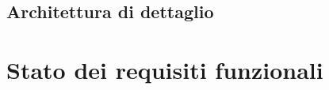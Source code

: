\documentclass[a4paper,10pt]{article}
\begin{document}
\subsection{Architettura di dettaglio}

\newpage



\newcommand{\reqF}[2]{%
    \refstepcounter{RF@#1}%
    \stepcounter{reqTotal}%
    \noindent{RF-#1-\arabic{RF@#1}}\quad #2\par
}


\section{Stato dei requisiti funzionali}
    
\end{document}
